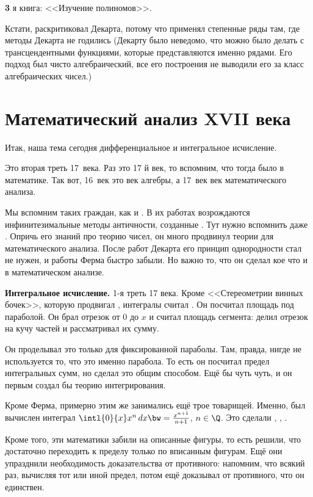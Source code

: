 \documentclass[a4paper,oneside,fleqn,10pt]{article}
\begin{document}
\textbf{3} я книга: <<Изучение полиномов>>.

Кстати,  раскритиковал Декарта, потому что применял степенные ряды
там, где методы Декарта не годились (Декарту было неведомо, что можно было
делать с трансцендентными функциями, которые представляются именно рядами.
Его подход был чисто алгебраический, все его построения не выводили его за класс алгебраических
чисел.)


\section{Математический анализ XVII века}

Итак, наша тема сегодня дифференциальное и интегральное исчисление.

Это вторая треть 17~века. Раз это 17 й век, то вспомним, что тогда было в математике.
Так вот, 16~век это век алгебры, а 17~век век математического анализа.

Мы вспомним таких граждан, как  и .
В их работах возрождаются инфинитезимальные методы
античности, созданные . Тут нужно вспомнить даже
. Опричь его знаний про теорию чисел,
он много продвинул теории для математического анализа.
После работ Декарта его принцип однородности стал не нужен, и работы Ферма быстро забыли.
Но важно то, что он сделал кое что и в математическом анализе.

\textbf{Интегральное исчисление.} 1-я треть 17 века. Кроме <<Стереометрии винных бочек>>,
которую продвигал , интегралы считал .
Он посчитал площадь под параболой. Он брал отрезок от 0 до $x$ и считал
площадь сегмента: делил отрезок на кучу частей и рассматривал их сумму.

Он проделывал это только для фиксированной параболы. Там, правда, нигде не используется
то, что это именно парабола. То есть он посчитал предел интегральных сумм,
но сделал это общим способом. Ещё бы чуть чуть, и он первым создал бы теорию
интегрирования.

Кроме Ферма, примерно этим же занимались ещё трое товарищей.
Именно, был вычислен интеграл $\intl{0}{x}x^n\,dx \bw= \frac{x^{n+1}}{n+1}$, $n \in \Q$.
Это сделали ,
, .

Кроме того, эти математики забили на описанные фигуры, то есть решили, что достаточно переходить
к пределу только по вписанным фигурам. Ещё они упразднили необходимость
доказательства от противного: напомним, что  всякий раз, вычисляя тот или иной предел,
потом ещё доказывал от противного, что он единствен.
\end{document}
